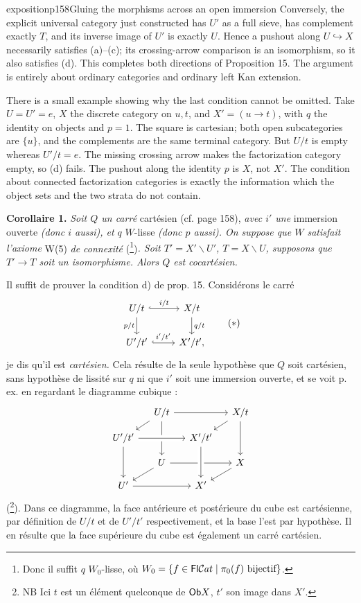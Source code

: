 \begin{dcomment}{exposition}{p158}{Gluing the morphisms across an open immersion}
Conversely, the explicit universal category just constructed has $U'$ as a full sieve, has complement exactly $T$, and its inverse image of $U'$ is exactly $U$. Hence a pushout along $U\hookrightarrow X$ necessarily satisfies (a)--(c); its crossing-arrow comparison is an isomorphism, so it also satisfies (d). This completes both directions of Proposition 15. The argument is entirely about ordinary categories and ordinary left Kan extension.

There is a small example showing why the last condition cannot be omitted. Take $U=U'=e$, $X$ the discrete category on $u,t$, and $X'=(u\to t)$, with $q$ the identity on objects and $p=1$. The square is cartesian; both open subcategories are $\{u\}$, and the complements are the same terminal category. But $U/t$ is empty whereas $U'/t=e$. The missing crossing arrow makes the factorization category empty, so (d) fails. The pushout along the identity $p$ is $X$, not $X'$. The condition about connected factorization categories is exactly the information which the object sets and the two strata do not contain.
\end{dcomment}


\textbf{Corollaire 1.} \textit{Soit $Q$ un carré} cartésien (cf. page 158), \textit{avec $i'$ une} immersion ouverte \textit{(donc $i$ aussi), et $q$} $W$-lisse \textit{(donc $p$ aussi). On suppose que $W$ satisfait l'axiome} W(5) \textit{de connexité} (\footnote[109]{Donc il suffit $q$ $W_0$-lisse, où $W_0 = \{f \in \mathsf{Fl} \mathcal{C}at \mid \pi_0(f) \text{ bijectif}\}$.})\textit{. Soit $T' = X' \backslash U'$, $T = X \backslash U$, supposons que $T' \longrightarrow T$ soit un isomorphisme. Alors $Q$ est cocartésien.}

Il suffit de prouver la condition d) de prop. 15. Considérons le carré
\[
\begin{tikzcd}
U/t \ar[r, hook, "i/t"] \ar[d, "p/t"'] & X/t \ar[d, "q/t"] \\
U'/t' \ar[r, hook, "i'/t'"] & X'/t',
\end{tikzcd}
\tag*{$(*)$}
\]
je dis qu'il est \textit{cartésien.} Cela résulte de la seule hypothèse que $Q$ soit cartésien, sans hypothèse de lissité sur $q$ ni que $i'$ soit une immersion ouverte, et se voit p. ex. en regardant le diagramme cubique :
\[
\begin{tikzcd}[row sep=small, column sep=small]
& U/t \ar[rr] \ar[dl] \ar[dd] & & X/t \ar[dl] \ar[dd] \\
U'/t' \ar[rr, crossing over] \ar[dd] & & X'/t' & \\
& U \ar[rr] \ar[dl] & & X \ar[dl] \\
U' \ar[rr] & & X' \ar[from=uu, crossing over] &
\end{tikzcd}
\]
(\footnote[110]{NB Ici $t$ est un élément quelconque de $\mathsf{Ob} X$, $t'$ son image dans $X'$.}). Dans ce diagramme, la face antérieure et postérieure du cube est cartésienne, par définition de $U/t$ et de $U'/t'$
respectivement, et la base l'est par hypothèse. Il en résulte que la face supérieure du cube est également un carré cartésien.

